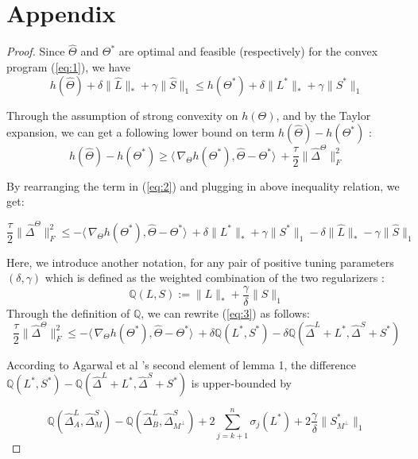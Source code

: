 \documentclass[AMS,STIX1COL]{WileyNJD-v2}
\begin{document}
\section{Appendix}
\begin{proof}
Since $\widehat{\Theta}$ and $\Theta^{*}$ are optimal and feasible (respectively) for the convex program (\ref{eq:1}), we have
\begin{equation}\label{eq:2}
    h(\widehat{\Theta}) + \delta\|\widehat{L}\|_{*} + \gamma\|\widehat{S}\|_{1} \leq
     h(\Theta^{*}) + \delta\|{L^{*}}\|_{*} + \gamma\|{S}^{*}\|_{1}
\end{equation}

Through the assumption of strong convexity on $h(\Theta)$, and by the Taylor expansion, we can get a following lower bound on term $h(\widehat{\Theta})-h(\Theta^{*})$ :
\[
h(\widehat{\Theta})-h(\Theta^{*}) \geq
\langle\, \nabla_{\Theta}h(\Theta^{*}),\widehat{\Theta}-\Theta^{*}\rangle\ + \frac{\tau}{2}\|\widehat{\Delta}^{\Theta}\|_{F}^{2}
\]

By rearranging the term in (\ref{eq:2}) and plugging in above inequality relation, we get:

\begin{equation}\label{eq:3}
    \frac{\tau}{2}\|\widehat{\Delta}^{\Theta}\|_{F}^{2} \leq
    -\langle\,\nabla_{\Theta}h(\Theta^{*}),\widehat{\Theta}-\Theta^{*}\rangle\
    + \delta \|L^{*}\|_\ast + \gamma \|S^{*}\|_1
    - \delta \|\widehat{L}\|_\ast - \gamma \|\widehat{S}\|_1
\end{equation}

Here, we introduce another notation, for any pair of positive tuning parameters $(\delta,\gamma)$ which is defined as the weighted combination of the two regularizers :
\[
\mathbb{Q}(L,S)   := \|L\|_{*} + \frac{\gamma}{\delta}\|S\|_1
\]
Through the definition of $\mathbb{Q}$, we can rewrite (\ref{eq:3}) as follows:
\begin{equation}\label{eq:4}
    \frac{\tau}{2}\|\widehat{\Delta}^{\Theta}\|_{F}^{2} \leq
    -\langle\,\nabla_{\Theta}h(\Theta^{*}),\widehat{\Theta}-\Theta^{*}\rangle\
    + \delta \mathbb{Q}(L^{*},S^{*}) - \delta \mathbb{Q}(\widehat{\Delta}^L + L^{*},\widehat{\Delta}^S + S^{*})
\end{equation}

According to Agarwal et al \cite{agarwal2012noisy}'s second element of lemma 1,
the difference $\mathbb{Q}(L^*,S^*)- \mathbb{Q}(\widehat{\Delta}^L + L^{*},\widehat{\Delta}^S + S^{*})$ is upper-bounded by

\begin{equation}\label{eq:5}
    \mathbb{Q}(\widehat{\Delta}^L_{A},\widehat{\Delta}^S_{M}) - \mathbb{Q}(\widehat{\Delta}^L_{B},\widehat{\Delta}^S_{M^\perp})
    +2 \sum_{j=k+1}^{n} \sigma_{j}(L^*) + 2\frac{\gamma}{\delta}\|S^*_{M^\perp}\|_{1}
\end{equation}


\end{proof}
\end{document}
